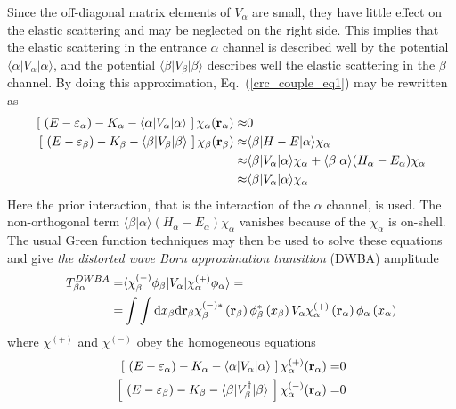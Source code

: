\documentclass[
12pt, %
oneside, %
english, %
onehalfspacing, %
onehalfspacing, %
headsepline, %
]{MastersDoctoralThesis} %
\begin{document}
Since the off-diagonal matrix elements of $V_\alpha$ are small, they have little effect on the elastic scattering and may be neglected on the right side. 
This implies that the elastic scattering in the entrance $\alpha$ channel is described well by the potential $\langle \alpha \vert V_\alpha \vert \alpha \rangle$, and the potential $\langle \beta \vert V_\beta \vert \beta \rangle$ describes well the elastic scattering in the $\beta$ channel.
By doing this approximation, Eq.~(\ref{crc_couple_eq1}) may be rewritten as
\begin{align}
\left[ ~\left(E-\varepsilon_\alpha \right)  -K_\alpha -
\langle \alpha \vert V_\alpha \vert \alpha \rangle ~\right] 
\chi_\alpha ({\bf r}_\alpha) \approx & 0
 \nonumber \\
\left[ ~\left(E-\varepsilon_\beta \right)  -K_\beta -
\langle \beta \vert V_\beta \vert \beta \rangle ~\right] 
\chi_\beta ({\bf r}_\beta) \approx &
\langle \beta \vert H-E \vert \alpha \rangle \chi_\alpha
\nonumber \\
\approx &
\langle \beta \vert V_\alpha \vert  \alpha \rangle \chi_\alpha + \langle \beta \vert \alpha \rangle (H_\alpha - E_\alpha) \chi_\alpha 
\nonumber \\
\approx & \langle \beta \vert V_\alpha \vert  \alpha \rangle \chi_\alpha
\label{crc_couple_eq2}
\end{align}
 Here the prior interaction, that is the interaction of the $\alpha$ channel, is used. The non-orthogonal term $\langle \beta \vert \alpha \rangle (H_\alpha - E_\alpha) \chi_\alpha$ vanishes because of the $\chi_\alpha$ is on-shell. The usual Green function techniques may then be used to solve these equations and give \textit{the  distorted wave Born approximation transition} (DWBA) amplitude 
 \begin{align}
 T_{\beta \alpha}^{DWBA} =& \langle \chi_\beta^{(-)} \phi_\beta  \vert V_\alpha \vert
 \chi_\alpha^{(+)} \phi_\alpha \rangle = \nonumber \\
= & \int \int \text{d}x_\beta \text{d}{\bf r}_\beta \chi_\beta^{(-)*} \left( {\bf r}_\beta \right)\phi_\beta^{*} \left( x_\beta \right) V_\alpha 
 \chi_\alpha^{(+)} \left( {\bf r}_\alpha \right)\phi_\alpha \left( x_\alpha \right)
 \end{align}
 where $\chi^{(+)}$ and $\chi^{(-)}$ obey the homogeneous equations
 \begin{align}
 \left[ ~\left(E-\varepsilon_\alpha \right)  -K_\alpha -
\langle \alpha \vert V_\alpha \vert \alpha \rangle ~\right] 
\chi_\alpha^{(+)} ({\bf r}_\alpha) = & 0 \nonumber \\
 \left[ ~\left(E-\varepsilon_\beta \right)  -K_\beta -
\langle \beta \vert V_\beta^{\dagger} \vert \beta \rangle ~\right] 
\chi_\alpha^{(-)} ({\bf r}_\alpha) = & 0 \nonumber
 \end{align}
\end{document}
